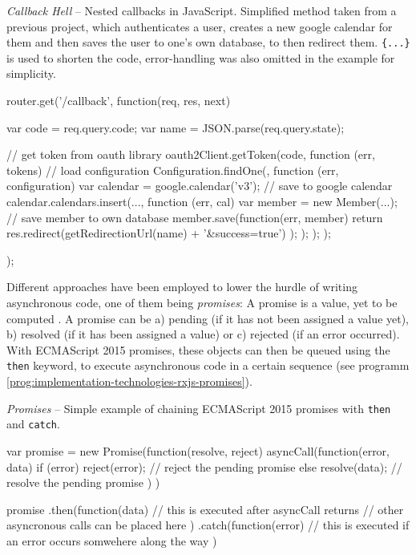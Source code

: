 \begin{program}
\caption{\emph{Callback Hell} -- Nested callbacks in JavaScript. Simplified method taken from a previous project, which authenticates a user, creates a new google calendar for them and then saves the user to one's own database, to then redirect them. \texttt{\{...\}} is used to shorten the code, error-handling was also omitted in the example for simplicity.}
\label{prog:implementation-technologies-rxjs-callback-hell}
\begin{JsCode}
router.get('/callback', function(req, res, next) {
  var code = req.query.code;
  var name = JSON.parse(req.query.state);

  // get token from oauth library
  oauth2Client.getToken(code, function (err, tokens) {
    // load configuration
    Configuration.findOne({}, function (err, configuration) {
      var calendar = google.calendar('v3');
      // save to google calendar
      calendar.calendars.insert({...}, function (err, cal) {
        var member = new Member({...});
        // save member to own database
        member.save(function(err, member) {
          return res.redirect(getRedirectionUrl(name) + '&success=true')
        });
      });
    });
  });
});
\end{JsCode}
\end{program}

Different approaches have been employed to lower the hurdle of writing asynchronous code, one of them being \emph{promises}: A promise is a value, yet to be computed \cite{reactive-vs-promises}. A promise can be a) pending (if it has not been assigned a value yet), b) resolved (if it has been assigned a value) or c) rejected (if an error occurred). With ECMAScript 2015 promises, these objects can then be queued using the \texttt{then} keyword, to execute asynchronous code in a certain sequence (see programm \ref{prog:implementation-technologies-rxjs-promises}).

\begin{program}
\caption{\emph{Promises} -- Simple example of chaining ECMAScript 2015 promises with \texttt{then} and \texttt{catch}.}
\label{prog:implementation-technologies-rxjs-promises}
\begin{JsCode}
var promise = new Promise(function(resolve, reject) {
  asyncCall(function(error, data) {
    if (error) {
      reject(error); // reject the pending promise
    } else {
      resolve(data); // resolve the pending promise
    }
  })
})

promise
  .then(function(data) {
    // this is executed after asyncCall returns
    // other asyncronous calls can be placed here
  })
  .catch(function(error) {
    // this is executed if an error occurs somwehere along the way
  })
\end{JsCode}
\end{program}

